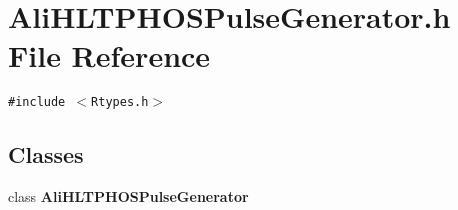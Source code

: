 \section{Ali\-HLTPHOSPulse\-Generator.h File Reference}
\label{AliHLTPHOSPulseGenerator_8h}


{\tt \#include $<$Rtypes.h$>$}\par
\subsection*{Classes}
\begin{CompactItemize}
\item 
class {\bf Ali\-HLTPHOSPulse\-Generator}
\end{CompactItemize}
